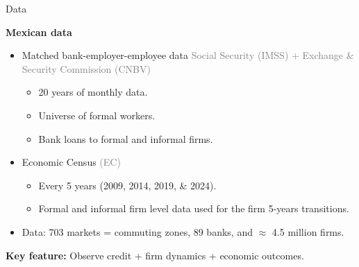 \documentclass[aspectratio=169]{beamer}
\begin{document}
\begin{frame}[noframenumbering]{Data}\label{data}

\textbf{Mexican data}

\vspace{3mm}

\begin{itemize}
    \item Matched bank-employer-employee data \textcolor{gray}{Social Security (IMSS) +  Exchange \& Security Commission (CNBV)}
    \begin{itemize}
        \item 20 years of monthly data.
        \item Universe of formal workers.
        \item Bank loans to formal and informal firms.
    \end{itemize}
    \vspace{3mm}
    \item Economic Census \textcolor{gray}{(EC)}
    \begin{itemize}
        \item Every 5 years (2009, 2014, 2019, \& 2024).
        \item Formal and informal firm level data used for the firm 5-years transitions.
    \end{itemize}
    \vspace{3mm}
    \item Data: 703 markets = commuting zones, 89 banks, and $\approx$ 4.5 million firms.
\end{itemize}

\vspace{3mm}

\begin{center}
    \large \textbf{Key feature:} Observe credit + firm dynamics + economic outcomes.
\end{center}

\hyperlink{this_paper}{}

\end{frame}

\end{document}
